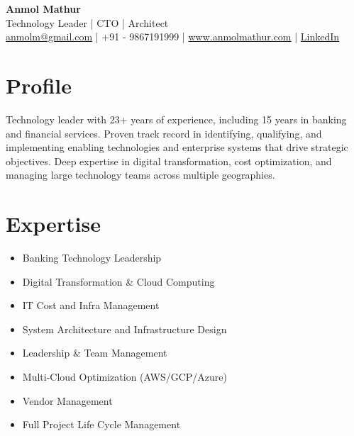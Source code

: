 \documentclass[a4paper,10pt]{article}
\begin{document}
\begin{center}
    {\Huge \textbf{Anmol Mathur}} \\
    {\large Technology Leader | CTO | Architect} \\
    \href{mailto:anmolm@gmail.com}{anmolm@gmail.com} | +91 - 9867191999 | \href{https://www.anmolmathur.com}{www.anmolmathur.com} | \href{https://linkedin.com/in/anmolmathur}{LinkedIn} 
\end{center}

\vspace{5mm}

\section*{Profile}
Technology leader with 23+ years of experience, including 15 years in banking and financial services. Proven track record in identifying, qualifying, and implementing enabling technologies and enterprise systems that drive strategic objectives. Deep expertise in digital transformation, cost optimization, and managing large technology teams across multiple geographies.

\section*{Expertise}
\begin{itemize}[leftmargin=0.5cm]
    \item Banking Technology Leadership
    \item Digital Transformation \& Cloud Computing
    \item IT Cost and Infra Management
    \item System Architecture and Infrastructure Design
    \item Leadership \& Team Management
    \item Multi-Cloud Optimization (AWS/GCP/Azure)
    \item Vendor Management
    \item Full Project Life Cycle Management
\end{itemize}

\end{document}
